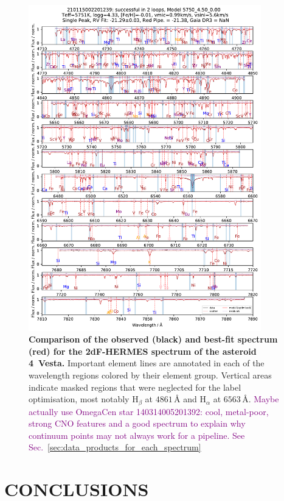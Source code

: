 \documentclass[
  journal=pasa,
  manuscript=research-paper, %
  year=2021,
  volume=37
]{cup-journal}
\newcommand{\SB}[1]{{\textcolor{purple}{#1}}}
\begin{document}
\begin{figure}[hbt!]
 \centering  
 \includegraphics[width=0.9\textwidth]{figures/210115002201239_single_fit_comparison.pdf}
\caption{\textbf{Comparison of the observed (black) and best-fit spectrum (red) for the 2dF-HERMES spectrum of the asteroid 4~Vesta.} Important element lines are annotated in each of the wavelength regions colored by their element group. Vertical areas indicate masked regions that were neglected for the label optimisation, most notably $\mathrm{H}_\beta$ at $4861\,\text{\AA}$ and $\mathrm{H}_\alpha$ at $6563\,\text{\AA}$. \SB{Maybe actually use OmegaCen star 140314005201392: cool, metal-poor, strong CNO features and a good spectrum to explain why continuum points may not always work for a pipeline. See Sec.~\ref{sec:data_products_for_each_spectrum}}} \label{fig:210115002201239_single_fit_comparison}
\end{figure}

\newpage
\section{CONCLUSIONS}
\label{sec:conclusion}
\end{document}
